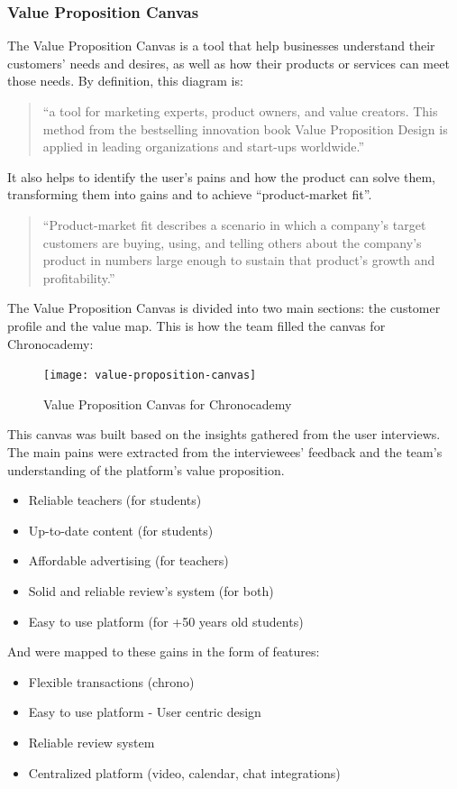 \subsubsection{Value Proposition Canvas}\label{subsubsec:value-proposition-canvas}
The Value Proposition Canvas is a tool that help businesses understand their customers' needs and desires, as well as how their products or services can meet those needs.
By definition, this diagram is:
\begin{quote}
    ``a tool for marketing experts, product
    owners, and value creators.
    This method from the bestselling innovation
    book Value Proposition Design is applied in leading organizations and
    start-ups worldwide.''~\cite[Value Proposition Canvas]{valuePropositionCanvas}
\end{quote}

It also helps to identify the user's pains and how the product can solve them, transforming them into gains and to achieve ``product-market fit''.\newline
\begin{quote}
    ``Product-market fit describes a scenario in which a company’s target
    customers are buying, using, and telling others about the company’s
    product in numbers large enough to sustain that product’s growth and
    profitability.''~\cite[Product Market Fit]{productMarketFit}
\end{quote}

The Value Proposition Canvas is divided into two main sections: the customer profile and the value map.
This is how the team filled the canvas for Chronocademy:

\begin{figure}[h]
    \centering
    \texttt{[image: value-proposition-canvas]}
    \caption{Value Proposition Canvas for Chronocademy}
    \label{fig:figure13}
\end{figure}

This canvas was built based on the insights gathered from the user interviews.
The main pains were extracted from the interviewees' feedback and the team's understanding of the platform's value proposition.
\begin{itemize}
    \item Reliable teachers (for students)
    \item Up-to-date content (for students)
    \item Affordable advertising (for teachers)
    \item Solid and reliable review's system (for both)
    \item Easy to use platform (for +50 years old students)
\end{itemize}
And were mapped to these gains in the form of features:
\begin{itemize}
    \item Flexible transactions (chrono)
    \item Easy to use platform - User centric design
    \item Reliable review system
    \item Centralized platform (video, calendar, chat integrations)
\end{itemize}

